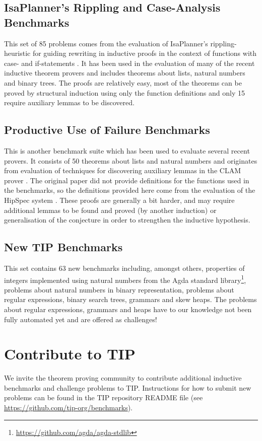 \documentclass{llncs}
\begin{document}
\subsection{IsaPlanner's Rippling and Case-Analysis Benchmarks}
\label{sec:isap}
This set of 85 problems comes from the evaluation of IsaPlanner's rippling-heuristic for guiding rewriting in inductive proofs in the context of functions with case- and if-statements \cite{IsaPcase}. It has been used in the evaluation of many of the recent inductive theorem provers and includes theorems about lists, natural numbers and binary trees. The proofs are relatively easy, most of the theorems can be proved by structural induction using only the function definitions and only 15 require auxiliary lemmas to be discovered.

\subsection{Productive Use of Failure Benchmarks}
This is another benchmark suite which has been used to evaluate several recent provers. It consists of 50 theorems about lists and natural numbers and originates from evaluation of techniques for discovering auxiliary lemmas in the CLAM prover \cite{productiveuse}. The original paper did not provide definitions for the functions used in the benchmarks, so the definitions provided here come from the evaluation of the HipSpec system \cite{hipspecCADE}. These proofs are generally a bit harder, and may require additional lemmas to be found and proved (by another induction) or generalisation of the conjecture in order to strengthen the inductive hypothesis. 

\subsection{New TIP Benchmarks}
This set contains 63 new benchmarks including, amongst others, properties of integers implemented using natural numbers from the Agda standard library\footnote{\url{https://github.com/agda/agda-stdlib}}, problems about natural numbers in binary representation, problems about regular expressions, binary search trees, grammars and skew heaps. The problems about regular expressions, grammars and heaps have to our knowledge not been fully automated yet and are offered as challenges! 

\section{Contribute to TIP}
We invite the theorem proving community to contribute additional inductive benchmarks and challenge problems to TIP. Instructions for how to submit new problems can be found in the TIP repository README file (see \url{https://github.com/tip-org/benchmarks}).
\end{document}
